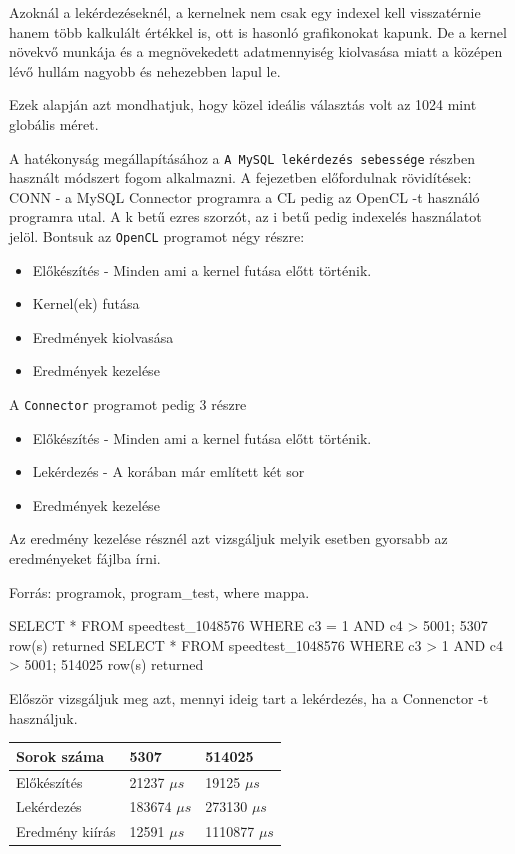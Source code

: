 Azoknál a lekérdezéseknél, a kernelnek nem csak egy indexel kell visszatérnie hanem több kalkulált értékkel is, ott is hasonló grafikonokat kapunk. De a kernel növekvő munkája és a megnövekedett adatmennyiség kiolvasása miatt a középen lévő hullám nagyobb és nehezebben lapul le.

Ezek alapján azt mondhatjuk, hogy közel ideális választás volt az 1024 mint globális méret.


A hatékonyság megállapításához a \texttt{A MySQL lekérdezés sebessége} részben használt módszert fogom alkalmazni.
A fejezetben előfordulnak rövidítések: CONN - a MySQL Connector programra a CL pedig az OpenCL -t használó programra utal. 
A k betű ezres szorzót, az i betű pedig indexelés használatot jelöl.
\newline Bontsuk az \texttt{OpenCL} programot négy részre:
\begin{itemize}
\item Előkészítés - Minden ami a kernel futása előtt történik.
\item Kernel(ek) futása
\item Eredmények kiolvasása
\item Eredmények kezelése
\end{itemize}
A \texttt{Connector} programot pedig 3 részre
\begin{itemize}
\item Előkészítés - Minden ami a kernel futása előtt történik.
\item Lekérdezés - A korában már említett két sor
\item Eredmények kezelése
\end{itemize}
Az eredmény kezelése résznél azt vizsgáljuk melyik esetben gyorsabb az eredményeket fájlba írni.

Forrás: programok, program\_test, where mappa.
\begin{python}
SELECT * FROM speedtest_1048576 WHERE c3 = 1 AND c4 > 5001;
	5307 row(s) returned
SELECT * FROM speedtest_1048576 WHERE c3 > 1 AND c4 > 5001;
	514025 row(s) returned
\end{python}
Először vizsgáljuk meg azt, mennyi ideig tart a lekérdezés, ha a Connenctor -t használjuk.

\begin{table}[h!]
\centering
\begin{tabular}{|p{6cm}|p{3cm}|p{3cm}|}
\hline
Sorok száma & 5307 & 514025 \\
\hline\hline

Előkészítés & 21237 $\mu s$ & 19125 $\mu s$ \\
\hline

Lekérdezés & 183674 $\mu s$ & 273130 $\mu s$ \\
\hline

Eredmény kiírás & 12591 $\mu s$ & 1110877 $\mu s$ \\
\hline
\end{tabular}
\end{table}

